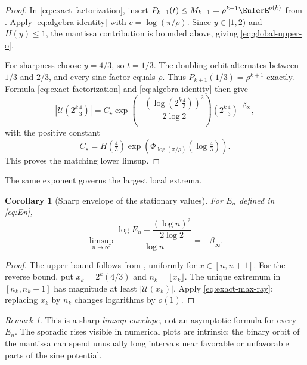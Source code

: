 \documentclass[11pt,oneside]{article}
\newtheorem{corollary}[theorem]{Corollary}
\theoremstyle{definition}
\theoremstyle{remark}
\newtheorem{remark}[theorem]{Remark}
\newcommand{\Uhat}{\mathcal U}
\begin{document}
\begin{proof}
In \eqref{eq:exact-factorization}, insert
$P_{k+1}(t)\le M_{k+1}=\rho^{k+1}\EulerE^{o(k)}$ from
.  Apply \eqref{eq:algebra-identity} with
$c=\log(\pi/\rho)$.  Since $y\in[1,2)$ and $H(y)\le1$, the mantissa contribution is
bounded above, giving \eqref{eq:global-upper-o}.

For sharpness choose $y=4/3$, so $t=1/3$.  The doubling orbit alternates between
$1/3$ and $2/3$, and every sine factor equals $\rho$.  Thus
$P_{k+1}(1/3)=\rho^{k+1}$ exactly.  Formula \eqref{eq:exact-factorization} and
\eqref{eq:algebra-identity} then give
\begin{equation}\label{eq:exact-max-ray}
 |\Uhat(2^k\tfrac43)|
 =C_\star
 \exp\!\left(-\frac{(\log(2^k\tfrac43))^2}{2\log2}\right)
 (2^k\tfrac43)^{-\beta_\infty},
\end{equation}
with the positive constant
\[
 C_\star=H(\tfrac43)
 \exp\!\left(
 \Phi_{\log(\pi/\rho)}(\log\tfrac43)
 \right).
\]
This proves the matching lower limsup.
\end{proof}

The same exponent governs the largest local extrema.

\begin{corollary}[Sharp envelope of the stationary values]\label{cor:extrema-envelope}
For $E_n$ defined in \eqref{eq:En},
\begin{equation}\label{eq:En-limsup}
 \limsup_{n\to\infty}
 \frac{
 \log E_n+\dfrac{(\log n)^2}{2\log2}}
 {\log n}
 =-\beta_\infty.
\end{equation}
\end{corollary}

\begin{proof}
The upper bound follows from , uniformly for $x\in[n,n+1]$.
For the reverse bound, put $x_k=2^k(4/3)$ and $n_k=\lfloor x_k\rfloor$.  The unique
extremum in $[n_k,n_k+1]$ has magnitude at least $|\Uhat(x_k)|$.  Apply
\eqref{eq:exact-max-ray}; replacing $x_k$ by $n_k$ changes logarithms by $o(1)$.
\end{proof}

\begin{remark}
This is a sharp \emph{limsup envelope}, not an asymptotic formula for every $E_n$.
The sporadic rises visible in numerical plots are intrinsic: the binary orbit of the
mantissa can spend unusually long intervals near favorable or unfavorable parts of the
sine potential.
\end{remark}
\end{document}
